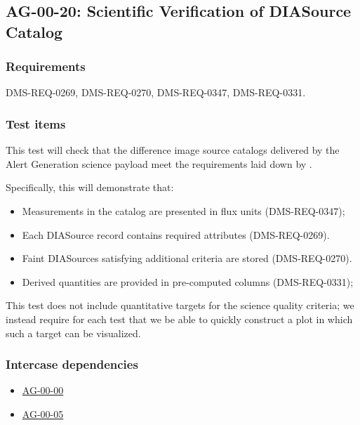 \subsection{AG-00-20: Scientific Verification of DIASource Catalog}
\label{ag-00-20}

\subsubsection{Requirements}

DMS-REQ-0269, DMS-REQ-0270, DMS-REQ-0347, DMS-REQ-0331.

\subsubsection{Test items}
\label{ag-00-20-items}

This test will check that the difference image source catalogs 
delivered by the Alert Generation science
payload meet the requirements laid down by .

Specifically, this will demonstrate that:

\begin{itemize}

  \item{Measurements in the catalog are presented in flux units (DMS-REQ-0347);} 
\item{Each DIASource record contains required attributes
	(DMS-REQ-0269).}

\item{Faint DIASources satisfying additional criteria are stored
	(DMS-REQ-0270).}

  \item{Derived quantities are provided in pre-computed columns (DMS-REQ-0331);} 

\end{itemize}

This test does not include quantitative targets for the science quality criteria; we instead require for each test that we be able to quickly construct a plot in which such a target can be visualized.

\subsubsection{Intercase dependencies}

\begin{itemize}

  \item{\hyperref[ag-00-00]{AG-00-00}}
  \item{\hyperref[ag-00-05]{AG-00-05}}

\end{itemize}

